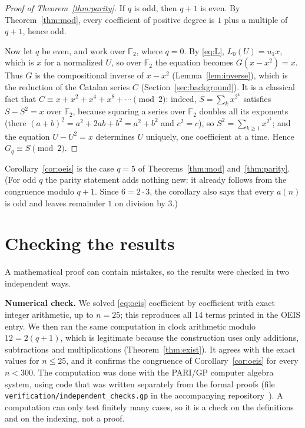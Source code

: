 \documentclass[11pt,a4paper]{article}
\theoremstyle{definition}
\theoremstyle{remark}
\newcommand{\F}{\mathbb{F}}
\newcommand{\para}[1]{\par\medskip\noindent\textbf{#1}\enspace}
\begin{document}
\begin{proof}[Proof of Theorem~\ref{thm:parity}]
If $q$ is odd, then $q+1$ is even. By Theorem~\ref{thm:mod}, every coefficient of positive degree is $1$ plus a multiple
of $q+1$, hence odd.

Now let $q$ be even, and work over $\F_2$, where $q=0$. By \eqref{eq:L}, $L_0(U)=u_1x$, which is $x$ for a normalized
$U$, so over $\F_2$ the equation becomes $G(x-x^2)=x$. Thus $G$ is the compositional inverse of $x-x^2$
(Lemma~\ref{lem:inverse}), which is the reduction of the Catalan series $C$ (Section~\ref{sec:background}). It is a
classical fact that $C\equiv x+x^2+x^4+x^8+\cdots\pmod 2$: indeed, $S=\sum_kx^{2^k}$ satisfies $S-S^2=x$ over $\F_2$,
because squaring a series over $\F_2$ doubles all its exponents (there $(a+b)^2=a^2+2ab+b^2=a^2+b^2$ and $c^2=c$), so $S^2=\sum_{k\ge1}x^{2^k}$; and the equation
$U-U^2=x$ determines $U$ uniquely, one coefficient at a time. Hence $G_q\equiv S\pmod2$.
\end{proof}


Corollary~\ref{cor:oeis} is the case $q=5$ of Theorems~\ref{thm:mod} and~\ref{thm:parity}.
(For odd $q$ the parity statement adds nothing new: it already follows from the congruence modulo $q+1$. Since $6=2\cdot3$, the corollary also says that every $a(n)$ is odd and leaves remainder $1$ on division by $3$.)

\section{Checking the results}\label{sec:checks}

A mathematical proof can contain mistakes, so the results were checked in two independent ways.

\para{Numerical check.}
We solved \eqref{eq:oeis} coefficient by coefficient with exact integer arithmetic, up to $n=25$; this
reproduces all 14 terms printed in the OEIS entry. We then ran the same computation in clock
arithmetic modulo $12=2(q+1)$, which is legitimate because the construction uses only additions,
subtractions and multiplications (Theorem~\ref{thm:exist}). It agrees with the exact values for $n\le25$, and it confirms
the congruence of Corollary~\ref{cor:oeis} for every $n<300$.
The computation was done with the PARI/GP computer algebra system, using code that was written separately from the
formal proofs (file \texttt{verification/independent\_checks.gp} in the accompanying repository~\cite{repo}).
A computation can only test finitely many cases, so it is a check on the definitions and on the indexing, not a proof.
\end{document}
